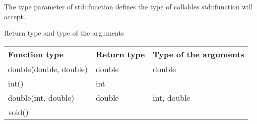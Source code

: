 The type parameter of std::function defines the type of callables std::function will accept.

\begin{center}
Return type and type of the arguments
\end{center}

\begin{longtable}[c]{|l|l|l|}
\hline
Function type          & Return type & Type of the arguments \\ \hline
\endfirsthead
%
\endhead
%
double(double, double) & double      & double                \\ \hline
int()                  & int         &                       \\ \hline
double(int, double)    & double      & int, double           \\ \hline
void()                 &             &                       \\ \hline
\end{longtable}






















